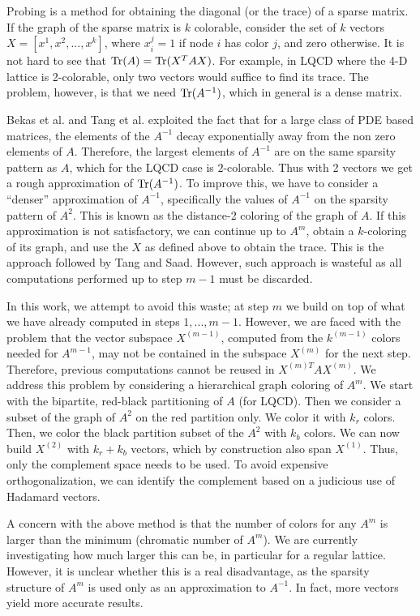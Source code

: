 \documentclass{report}
\begin{document}
Probing is a method for obtaining the diagonal (or the trace) of a sparse
matrix. If the graph of the sparse matrix is $k$ colorable,
consider the set of $k$ vectors $X = [x^1, x^2, ..., x^k]$,
where $x^j_i = 1$ if node $i$ has color $j$, and zero otherwise.
It is not hard to see that ${\rm Tr}(A) = {\rm Tr}(X^T AX)$.
For example, in LQCD where the 4-D lattice is 2-colorable, only two
vectors would suffice to find its trace. The problem, however, is that
we need ${\rm Tr}(A^{-1})$, which in general is a dense matrix.

Bekas et al. and Tang et al. exploited the fact that for a large class
of PDE based matrices, the elements of the $A^{-1}$ decay exponentially
away from the non zero elements of $A$. Therefore, the largest elements
of $A^{-1}$ are on the same sparsity pattern as $A$, which for the LQCD
case is $2$-colorable. Thus with 2 vectors we get a rough approximation
of ${\rm Tr}(A^{-1})$. To improve this, we have to consider a ``denser''
approximation of $A^{-1}$, specifically the values of $A^{-1}$ on the
sparsity pattern of $A^2$. This is known as the distance-2 coloring
of the graph of $A$. If this approximation is not satisfactory, we
can continue up to $A^m$, obtain a $k$-coloring of its graph, and use
the $X$ as defined above to obtain the trace. This is the approach
followed by Tang and Saad. However, such approach is wasteful as
all computations performed up to step $m-1$ must be discarded.

In this work, we attempt to avoid this waste; at step $m$ we build
on top of what we have already computed in steps $1,...,m-1$.
However, we are faced with the problem that the vector subspace $X^{(m-1)}$,
computed from the $k^{(m-1)}$ colors needed for $A^{m-1}$, may not be
contained in the subspace $X^{(m)}$ for the next step. Therefore,
previous computations cannot be reused in $X^{(m)T} AX^{(m)}$.
We address this problem by considering a hierarchical graph coloring of $A^m$.
We start with the bipartite, red-black partitioning of $A$ (for LQCD).
Then we consider a subset of the graph of $A^2$ on the red partition only.
We color it with $k_r$ colors.
Then, we color the black partition subset of the $A^2$ with $k_b$ colors.
We can now build $X^{(2)}$ with $k_r+k_b$ vectors, which by construction
also span $X^{(1)}$. Thus, only the complement space needs to be used.
To avoid expensive orthogonalization, we can identify the complement
based on a judicious use of Hadamard vectors.

A concern with the above method is that the number of colors for
any $A^m$ is larger than the minimum (chromatic number of $A^m$).
We are currently investigating how much larger this can be, in
particular for a regular lattice. However, it is unclear whether this is
a real disadvantage, as the sparsity structure of $A^m$ is used only as
an approximation to $A^{-1}$. In fact, more vectors yield more
accurate results.
\end{document}
